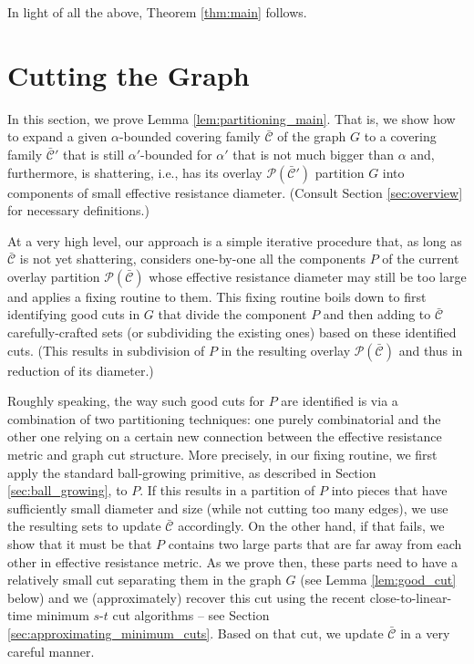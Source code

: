 \documentclass[11pt, letterpaper]{article}
\newcommand{\ocC}{\bar{\mathcal{C}}}
\newcommand{\cP}{\mathcal{P}}
\begin{document}
In light of all the above, Theorem \ref{thm:main} follows.



 \section{Cutting the Graph} \label{sec:parititioning}

In this section, we prove Lemma \ref{lem:partitioning_main}. That is, we show how to expand a given $\alpha$-bounded covering family $\ocC$ of the graph $G$ to a covering family $\ocC'$ that is still $\alpha'$-bounded for $\alpha'$ that is not much bigger than $\alpha$ and, furthermore, is shattering, i.e., has its overlay $\cP(\ocC')$ partition $G$ into components of small effective resistance diameter. (Consult Section \ref{sec:overview} for necessary definitions.)

At a very high level, our approach is a simple iterative procedure that, as long as $\ocC$ is not yet shattering, considers one-by-one all the components $P$ of the current overlay partition $\cP(\ocC)$ whose effective resistance diameter may still be too large and applies a fixing routine to them. This fixing routine boils down to first identifying good cuts in $G$ that divide the component $P$ and then adding to $\ocC$ carefully-crafted sets (or subdividing the existing ones) based on these identified cuts. (This results in subdivision of $P$ in the resulting overlay $\cP(\ocC)$ and thus in reduction of its diameter.)

Roughly speaking, the way such good cuts for $P$ are identified is via a combination of two partitioning techniques: one purely combinatorial and the other one relying on a certain new connection between the effective resistance metric and graph cut structure. More precisely, in our fixing routine, we first apply the standard ball-growing primitive, as described in Section \ref{sec:ball_growing}, to $P$. If this results in a partition of $P$ into pieces that have sufficiently small diameter and size (while not cutting too many edges), we use the resulting sets to update $\ocC$ accordingly. On the other hand, if that fails, we show that it must be that $P$ contains two large parts that are far away from each other in effective resistance metric. As we prove then, these parts need to have a relatively small cut separating them in the graph $G$ (see Lemma \ref{lem:good_cut} below) and we (approximately) recover this cut using the recent close-to-linear-time minimum $s$-$t$ cut algorithms -- see Section \ref{sec:approximating_minimum_cuts}. Based on that cut, we update $\ocC$ in a very careful manner. 
  
\end{document}
